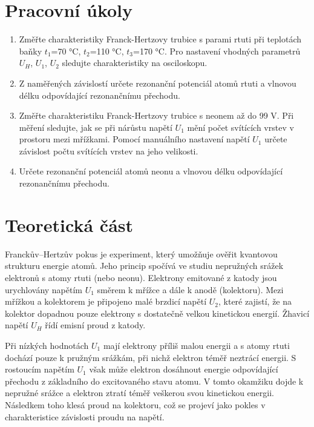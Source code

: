 \section{Pracovní úkoly}

\begin{enumerate}
\item Změřte charakteristiky Franck-Hertzovy trubice s parami rtuti při teplotách baňky $t_1$=70 °C, $t_2$=110 °C, $t_3$=170 °C. Pro nastavení vhodných parametrů $U_H$, $U_1$, $U_2$ sledujte charakteristiky na osciloskopu.

\item Z naměřených závislostí určete rezonanční potenciál atomů rtuti a vlnovou délku odpovídající rezonančnímu přechodu.

\item Změřte charakteristiku Franck-Hertzovy trubice s neonem až do 99 V. Při měření sledujte, jak se při nárůstu napětí $U_1$ mění počet svítících vrstev v prostoru mezi mřížkami. Pomocí manuálního nastavení napětí $U_1$ určete závislost počtu svítících vrstev na jeho velikosti.

\item Určete rezonanční potenciál atomů neonu a vlnovou délku odpovídající rezonančnímu přechodu.

\end{enumerate}

\section{Teoretická část}

Franckův–Hertzův pokus je experiment, který umožňuje ověřit kvantovou strukturu energie atomů. Jeho princip spočívá ve studiu nepružných srážek elektronů s atomy rtuti (nebo neonu). Elektrony emitované z katody jsou urychlovány napětím $U_1$ směrem k mřížce a dále k anodě (kolektoru). Mezi mřížkou a kolektorem je připojeno malé brzdicí napětí $U_2$, které zajistí, že na kolektor dopadnou pouze elektrony s dostatečně velkou kinetickou energií. Žhavicí napětí $U_H$ řídí emisní proud z katody. 

Při nízkých hodnotách $U_1$ mají elektrony příliš malou energii a s atomy rtuti dochází pouze k pružným srážkám, při nichž elektron téměř neztrácí energii. S rostoucím napětím $U_1$ však může elektron dosáhnout energie odpovídající přechodu z základního do excitovaného stavu atomu. V tomto okamžiku dojde k nepružné srážce a elektron ztratí téměř veškerou svou kinetickou energii. Následkem toho klesá proud na kolektoru, což se projeví jako pokles v charakteristice závislosti proudu na napětí.


